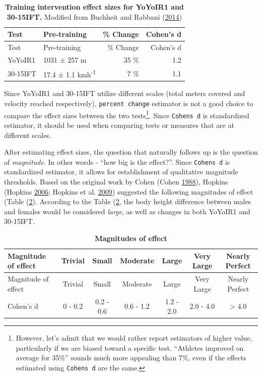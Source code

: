 \documentclass[
]{book}
\begin{document}
\begin{longtable}[]{@{}llrr@{}}
\caption{\label{tab:perc-change-vs-cohensd} \textbf{Training intervention effect sizes for YoYoIR1 and 30-15IFT.} Modified from Buchheit and Rabbani (\protect\hyperlink{ref-buchheit3015Intermittent2014}{2014})}\tabularnewline
\toprule
Test & Pre-training & \% Change & Cohen's d\tabularnewline
\midrule
\endfirsthead
\toprule
Test & Pre-training & \% Change & Cohen's d\tabularnewline
\midrule
\endhead
YoYoIR1 & 1031 ± 257 m & 35 \% & 1.2\tabularnewline
30-15IFT & 17.4 ± 1.1 kmh\textsuperscript{-1} & 7 \% & 1.1\tabularnewline
\bottomrule
\end{longtable}

Since YoYoIR1 and 30-15IFT utilize different scales (total meters covered and velocity reached respectively), \texttt{percent\ change} estimator is not a good choice to compare the effect sizes between the two tests\footnote{However, let's admit that we would rather report estimators of higher value, particularly if we are biased toward a specific test. ``Athletes improved on average for 35\%'' sounds much more appealing than 7\%, even if the effects estimated using \texttt{Cohen\textquotesingle{}s\ d} are the same.}. Since \texttt{Cohen\textquotesingle{}s\ d} is standardized estimator, it should be used when comparing tests or measures that are at different scales.

After estimating effect sizes, the question that naturally follows up is the question of \emph{magnitude}. In other words - ``how big is the effect?''. Since \texttt{Cohen\textquotesingle{}s\ d} is standardized estimator, it allows for establishment of qualitative magnitude thresholds. Based on the original work by Cohen (Cohen \protect\hyperlink{ref-cohenStatisticalPowerAnalysis1988}{1988}), Hopkins (Hopkins \protect\hyperlink{ref-hopkinsNewViewStatistics2006}{2006}; Hopkins et al. \protect\hyperlink{ref-hopkinsProgressiveStatisticsStudies2009}{2009}) suggested the following magnitudes of effect (Table (\ref{tab:magnitudes-of-effect}). According to the Table (\ref{tab:magnitudes-of-effect}, the body height difference between males and females would be considered \emph{large}, as well as changes in both YoYoIR1 and 30-15IFT.

\begin{longtable}[]{@{}lcccccc@{}}
\caption{\label{tab:magnitudes-of-effect} \textbf{Magnitudes of effect}}\tabularnewline
\toprule
Magnitude of effect & Trivial & Small & Moderate & Large & Very Large & Nearly Perfect\tabularnewline
\midrule
\endfirsthead
\toprule
Magnitude of effect & Trivial & Small & Moderate & Large & Very Large & Nearly Perfect\tabularnewline
\midrule
\endhead
Cohen's d & 0 - 0.2 & 0.2 - 0.6 & 0.6 - 1.2 & 1.2 - 2.0 & 2.0 - 4.0 & \textgreater{} 4.0\tabularnewline
\bottomrule
\end{longtable}
\end{document}
